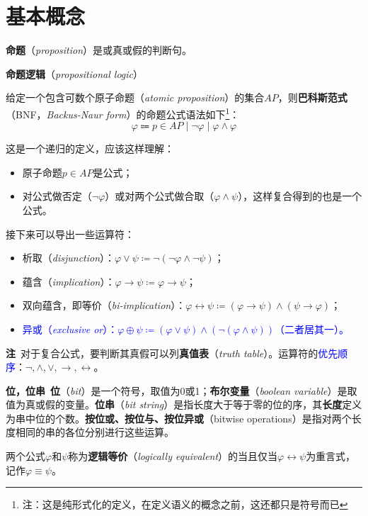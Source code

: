 \documentclass[b5paper,oneside]{ctexbook}
\newcommand{\Blue}[1]{\textcolor[named]{blue}{#1}}
\begin{document}
\section{基本概念}
\textbf{命题}（\emph{proposition}）是或真或假的判断句。

\textbf{命题逻辑}（\emph{propositional logic}）

给定一个包含可数个原子命题（\emph{atomic proposition}）的集合$AP$，则\textbf{巴科斯范式}（BNF，\emph{Backus-Naur form}）的命题公式语法如下\footnote{注：这是纯形式化的定义，在定义语义的概念之前，这还都只是符号而已}：
\[\varphi\Coloneqq p\in AP\mid \neg\varphi\mid\varphi\land\varphi\]

这是一个递归的定义，应该这样理解：
\begin{itemize}
\item 原子命题$p\in AP$是公式；
\item 对公式做否定（$\neg\varphi$）或对两个公式做合取（$\varphi\land\psi$），这样复合得到的也是一个公式。
\end{itemize}

接下来可以导出一些运算符：
\begin{itemize}
\item 析取（\emph{disjunction}）：$\varphi\lor\psi\coloneqq \neg(\neg\varphi\land\neg\psi)$；
\item 蕴含（\emph{implication}）：$\varphi\rightarrow\psi\coloneqq\varphi\rightarrow\psi$；
\item 双向蕴含，即等价（\emph{bi-implication}）：$\varphi\leftrightarrow\psi\coloneqq (\varphi\rightarrow\psi)\land(\psi\rightarrow\varphi)$；
\item \Blue{异或（\emph{exclusive or}）：$\varphi\oplus\psi\coloneqq (\varphi\lor\psi)\land(\neg(\varphi\land\psi ))$（二者居其一）。}
\end{itemize}

\textbf{注}\ 对于复合公式，要判断其真假可以列\textbf{真值表}（\emph{truth table}）。运算符的\Blue{优先顺序}：$\neg,\land,\lor,\rightarrow,\leftrightarrow$。

\textbf{位，位串}\ \textbf{位}（\emph{bit}）是一个符号，取值为0或1；\textbf{布尔变量}（\emph{boolean variable}）是取值为真或假的变量。\textbf{位串}（\emph{bit string}）是指长度大于等于零的位的序，其\textbf{长度}定义为串中位的个数。\textbf{按位或、按位与、按位异或}（bitwise operations）是指对两个长度相同的串的各位分别进行这些运算。

两个公式$\varphi$和$\psi$称为\textbf{逻辑等价}（\emph{logically equivalent}）的当且仅当$\varphi\leftrightarrow\psi$为重言式，记作$\varphi\equiv\psi$。
\end{document}
